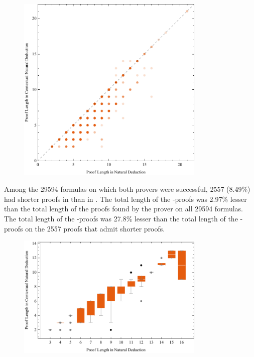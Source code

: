 \documentclass{llncs}
\begin{document}
\begin{figure}[!ht]
        \centering
        \includegraphics[width=0.8\textwidth]{Charts/Scatter.pdf}
        \caption{} \label{fig:Scatter}
\end{figure}

Among the 29594 formulas on which both provers were successful, 2557 (8.49\%) had shorter proofs in {\NDd} than in {\ND}. The total length of the {\NDd}-proofs was 2.97\% lesser than the total length of the proofs found by the {\ND} prover on all 29594 formulas. The total length of the {\NDd}-proofs was 27.8\% lesser than the total length of the {\ND}-proofs on the 2557 proofs that admit shorter {\NDd} proofs.

\begin{figure}[!ht]
        \centering
        \includegraphics[width=0.8\textwidth]{Charts/BoxWhiskers.pdf}
        \caption{} \label{fig:BoxWhiskers}
\end{figure}
\end{document}
